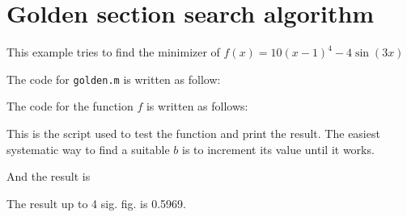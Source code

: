 \documentclass{article}
\begin{document}
\section*{Golden section search algorithm}

This example tries to find the minimizer of $f(x) = 10(x-1)^4 - 4\sin(3x)$

The code for \lstinline{golden.m} is written as follow:



The code for the function $f$ is written as follows:



This is the script used to test the function and print the result. The easiest systematic way to find a suitable $b$ is to increment its value until it works.



And the result is 



The result up to 4 sig. fig. is 0.5969.
\end{document}
